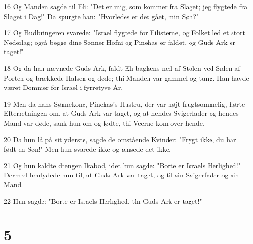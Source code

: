 \par 16 Og Manden sagde til Eli: "Det er mig, som kommer fra Slaget; jeg flygtede fra Slaget i Dag!" Da spurgte han: "Hvorledes er det gået, min Søn?"
\par 17 Og Budbringeren svarede: "Israel flygtede for Filisterne, og Folket led et stort Nederlag; også begge dine Sønner Hofni og Pinehas er faldet, og Guds Ark er taget!"
\par 18 Og da han nævnede Guds Ark, faldt Eli baglæns ned af Stolen ved Siden af Porten og brækkede Halsen og døde; thi Manden var gammel og tung. Han havde været Dommer for Israel i fyrretyve År.
\par 19 Men da hans Sønnekone, Pinehas's Hustru, der var højt frugtsommelig, hørte Efterretningen om, at Guds Ark var taget, og at hendes Svigerfader og hendes Mand var døde, sank hun om og fødte, thi Veerne kom over hende.
\par 20 Da hun lå på sit yderste, sagde de omstående Kvinder: "Frygt ikke, du har født en Søn!" Men hun svarede ikke og ænsede det ikke.
\par 21 Og hun kaldte drengen Ikabod, idet hun sagde: "Borte er Israels Herlighed!" Dermed hentydede hun til, at Guds Ark var taget, og til sin Svigerfader og sin Mand.
\par 22 Hun sagde: "Borte er Israels Herlighed, thi Guds Ark er taget!"

\chapter{5}

